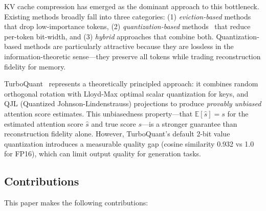 \documentclass[10pt,twocolumn]{article}
\newcommand{\Eop}{\mathbb{E}}
\begin{document}
KV cache compression has emerged as the dominant approach to this bottleneck. Existing methods broadly fall into three categories: (1) \emph{eviction-based} methods~\cite{zhang2023h2o} that drop low-importance tokens, (2) \emph{quantization-based} methods~\cite{liu2024kivi,hooper2024kvquant} that reduce per-token bit-width, and (3) \emph{hybrid} approaches that combine both. Quantization-based methods are particularly attractive because they are lossless in the information-theoretic sense—they preserve all tokens while trading reconstruction fidelity for memory.

TurboQuant~\cite{turboquant2025} represents a theoretically principled approach: it combines random orthogonal rotation with Lloyd-Max optimal scalar quantization for keys, and QJL (Quantized Johnson-Lindenstrauss) projections to produce \emph{provably unbiased} attention score estimates. This unbiasedness property—that $\Eop[\hat{s}] = s$ for the estimated attention score $\hat{s}$ and true score $s$—is a stronger guarantee than reconstruction fidelity alone. However, TurboQuant's default 2-bit value quantization introduces a measurable quality gap (cosine similarity 0.932 vs 1.0 for FP16), which can limit output quality for generation tasks.

\subsection*{Contributions}
This paper makes the following contributions:
\end{document}
